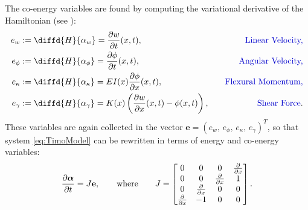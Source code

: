 \documentclass[preprint,12pt]{elsarticle}
\newcommand{\secondReviewer}[1]{\textcolor{blue!80!black}{#1}}
\begin{document}
The co-energy variables are found by computing the variational derivative of the Hamiltonian (see  \cite{MacchelliTimo}):
\begin{equation}
\begin{aligned}
e_{w} &:= \diffd{H}{\alpha_w} = \diffp{w}{t}(x,t), \quad &\text{\secondReviewer{Linear Velocity,}} \\
e_{\phi} &:= \diffd{H}{\alpha_{\phi}} = \diffp{\phi}{t}(x,t), \quad &\text{\secondReviewer{Angular Velocity,}} \\
e_{\kappa} &:= \diffd{H}{\alpha_{\kappa}} =EI(x) \diffp{\phi}{x}(x,t), \quad &\text{\secondReviewer{Flexural Momentum,}}\\
e_{\gamma} &:= \diffd{H}{\alpha_{\gamma}} = K(x) \left(\diffp{w}{x}(x,t) - \phi(x,t) \right), \quad &\text{\secondReviewer{Shear Force}}. \\
\end{aligned}
\end{equation}
These variables are again collected in the vector $\bm{e} = (e_{w}, \, e_{\phi}, \, e_{\kappa}, \, e_{\gamma} )^T $, so that \secondReviewer{system \eqref{eq:TimoModel} can be rewritten in terms of energy and co-energy variables:}
\begin{equation}
\label{eq:PH_Timo}
\diffp{\bm{\alpha}}{t} = J \mathbf{e},  	\qquad \text{where} \qquad
J = 
\begin{bmatrix}
0 & 0 & 0 & \diffp{}{x} \\
0 & 0 & \diffp{}{x} & 1  \\
0 & \diffp{}{x} & 0 & 0 \\
\diffp{}{x} & -1 & 0 & 0 \\
\end{bmatrix} .
\end{equation}
\end{document}

